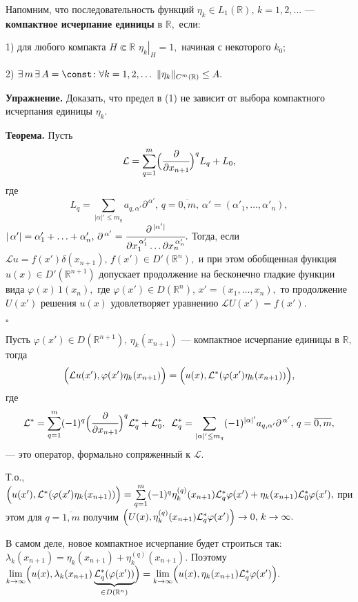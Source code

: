 \documentclass[12pt,a4paper,draft]{article}
\DeclareRobustCommand*{\т}{~--- }
\DeclareRobustCommand*{\ч}{~-- }
\begin{document}
Напомним, что последовательность функций $\eta_k\in L_1(\mathbb
R),\,k=1,2,\ldots$ --- \textbf{компактное исчерпание единицы } в
$\mathbb R,$ если:

1) для любого компакта $H\Subset\mathbb R\,\,
\left.\eta_k\right|_H=1,$ начиная с некоторого $k_0$;

2) $\exists\,m\,\exists\, A=\const  \colon \forall
k=1,2,\ldots\,\, \|\eta_k\|_{C^m(\mathbb R)}\le A.$

\textbf{Упражнение.} Доказать, что предел в (1) не зависит от
выбора компактного исчерпания единицы $\eta_k$.

\textbf{Теорема.} Пусть
$$\mathcal
L=\sum\limits_{q=1}^m\Bigl(\cfrac{\partial}{\partial
x_{n+1}}\Bigr)^q L_q+L_0,$$
где $$L_q=\sum\limits_{|\alpha|'\le
m_q}a_{q,\alpha'}{\partial^{\, \alpha'}},\,q=\overline{0,m},\,
\alpha'=(\alpha'_1,\ldots,\alpha'_n),$$
$|\,\alpha'|=\alpha'_1+\ldots+\alpha'_n,
\,\partial^{\,\alpha'}=\cfrac {\partial^{\,|\alpha'|}}{\partial
x_1^{\,\alpha'_1}\ldots
\partial x_n^{\,\alpha'_n}}.$ Тогда, если $\mathcal
L u=f(x')\delta(x_{n+1}),\,f(x')\in D'(\mathbb R^n),$ и при этом
обобщенная функция $u(x)\in D'(\mathbb R^{n+1})$ допускает
продолжение на бесконечно гладкие функции вида
$\varphi(x)\,1(x_{n}),$ где $\varphi(x')\in D(\mathbb
R^{n}),\,x'=(x_1,\ldots,x_n),$ то продолжение $U(x')$ решения
$u(x)$ удовлетворяет уравнению $\mathcal L U(x')=f(x').$

$\square$

Пусть $\varphi(x')\in D(\mathbb R^{n+1}),\,\eta_k(x_{n+1})$ ---
компактное исчерпание единицы в $\mathbb R,$ тогда
$$\Bigl(\mathcal L
u(x'),\varphi(x')\eta_k(x_{n+1})\Bigr)=\Bigl(u(x),\mathcal
L^*(\varphi(x')\eta_k(x_{n+1}))\Bigr),$$ где
$$\mathcal L^*=\sum\limits_{q=1}^m (-1)^q \Bigl( \cfrac{\partial}{\partial
x_{n+1}}\Bigr)^q \mathcal L^*_q + \mathcal L^*_0,\,\,\,\mathcal
L^*_q=\sum\limits_{|\alpha|'\le
m_q}(-1)^{|\alpha|'}a_{q,\alpha'}{\partial^{\,
\alpha'}},\,q=\overline{0,m},$$ --- это оператор, формально
сопряженный к $\mathcal L.$

Т.о., $\Bigl(u(x'),\mathcal L^*(\varphi(x')\eta_k(x_{n+1}))\Bigr)=
\sum\limits_{q=1}^m (-1)^q \eta_k^{(q)}(x_{n+1})\mathcal L^*_q
\varphi(x')+\eta_k(x_{n+1})\mathcal L^*_0\varphi(x'),$ при этом
для $q=\overline{1,m}$ получим
$\Bigl(U(x),\eta_k^{(q)}(x_{n+1})\mathcal
L^*_q\varphi(x')\Bigr)\to0,\,k\to{\infty}.$

В самом деле, новое компактное исчерпание будет строиться так:
$\lambda_k(x_{n+1})=\eta_k(x_{n+1})+\eta_k^{(q)}(x_{n+1}).$
Поэтому
$\lim\limits_{k\to\infty}\Bigl(u(x),\lambda_k(x_{n+1})\underbrace{\mathcal
L^*_q(\varphi(x'))}_{\in D(\mathbb R^n)}\Bigr)=
\lim\limits_{k\to\infty}\Bigl(u(x),\eta_k(x_{n+1})\mathcal
L^*_q\varphi(x')\Bigr).$
\end{document}
